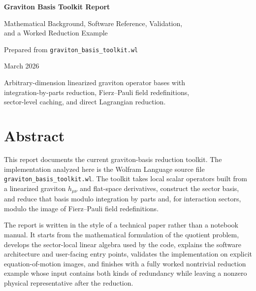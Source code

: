 \documentclass[11pt]{report}
\numberwithin{equation}{chapter}
\newcommand{\toolkit}{\texttt{graviton\_basis\_toolkit.wl}}
\begin{document}
\hypersetup{pageanchor=false}
\begin{titlepage}
\thispagestyle{empty}
\centering
\vspace*{2.5cm}
{\Huge\bfseries Graviton Basis Toolkit Report\par}
\vspace{0.9cm}
{\Large Mathematical Background, Software Reference, Validation,\\ and a Worked Reduction Example\par}
\vspace{1.8cm}
{\large Prepared from \toolkit\par}
\vspace{0.4cm}
{\large March 2026\par}
\vfill
{\large
Arbitrary-dimension linearized graviton operator bases with\\
integration-by-parts reduction, Fierz--Pauli field redefinitions,\\
sector-level caching, and direct Lagrangian reduction.\par}
\vfill
\end{titlepage}

\clearpage
\hypersetup{pageanchor=true}

\chapter*{Abstract}

This report documents the current graviton-basis reduction toolkit.
The implementation analyzed here is the Wolfram Language source file \toolkit.
The toolkit takes local scalar operators built from a linearized graviton \(h_{\mu\nu}\) and flat-space derivatives,
construct the sector basis, and reduce that basis modulo integration by parts and, for interaction sectors,
modulo the image of Fierz--Pauli field redefinitions.

The report is written in the style of a technical paper rather than a notebook manual.
It starts from the mathematical formulation of the quotient problem,
develops the sector-local linear algebra used by the code,
explains the software architecture and user-facing entry points,
validates the implementation on explicit equation-of-motion images,
and finishes with a fully worked nontrivial reduction example whose input contains both kinds of redundancy
while leaving a nonzero physical representative after the reduction.

\tableofcontents
\clearpage
{}
\end{document}
